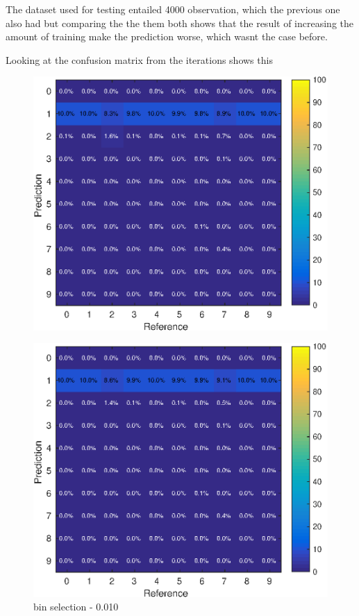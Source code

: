 \documentclass[10pt,a4paper]{article}
\begin{document}
The dataset used for testing entailed  4000 observation, which the previous one also had but comparing the the them both shows that the result of increasing the amount of training make the prediction worse, which wasnt the case before.

Looking at the confusion matrix from the iterations shows this

\begin{figure}[!htb]
  \includegraphics[width=\linewidth]{confus_10.eps}
\label{fig:awesome_image1}
\caption{bin selection - 0.010}
\endminipage\hfill
{}
  \includegraphics[width=\linewidth]{confus_32.eps}

\end{figure}
\end{document}
